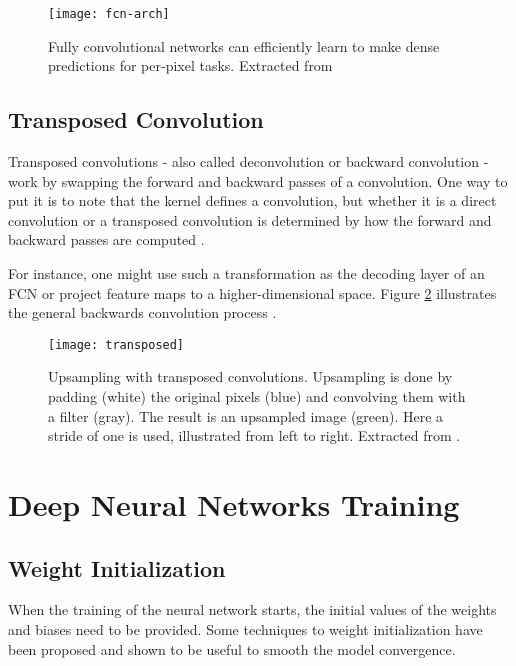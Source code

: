 \begin{figure}[!htb]
\centering
\texttt{[image: fcn-arch]}
\caption{Fully convolutional networks can efficiently learn to make dense predictions for
per-pixel tasks. Extracted from \cite{long2015fully}}
\label{fcn-arch}
\end{figure}

\subsection{Transposed Convolution}

Transposed convolutions - also called deconvolution or backward convolution - work by swapping the forward and backward passes of a convolution. One way to put it is to note that the kernel defines a convolution, but whether it is a direct convolution or a transposed convolution is determined by how the forward and backward passes are computed \cite{dumoulin2016guide}.

For instance, one might use such a transformation as the decoding layer of an FCN or project feature maps to a higher-dimensional space. Figure \ref{fig:transposed} illustrates the general backwards convolution process \cite{dumoulin2016guide}.

\begin{figure}[!htb]
\centering
\texttt{[image: transposed]}

\caption{Upsampling with transposed convolutions. Upsampling is done by padding
(white) the original pixels (blue) and convolving them with a filter (gray). The result is
an upsampled image (green). Here a stride of one is used, illustrated from left to right. Extracted from \cite{dumoulin2016guide}.} \label{fig:transposed}
\end{figure}

\section{Deep Neural Networks Training}

\subsection{Weight Initialization}
When the training of the neural network starts, the initial values of the weights and biases need to be provided. Some techniques to weight initialization have been proposed and shown to be useful to smooth the model convergence.

